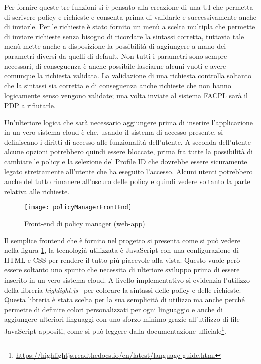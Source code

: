Per fornire queste tre funzioni si è pensato alla creazione di una UI che permetta di scrivere policy e richieste e consenta prima di validarle e successivamente anche di inviarle. Per le richieste è stato fornito un menù a scelta multipla che permette di inviare richieste senza bisogno di ricordare la sintassi corretta, tuttavia tale menù mette anche a disposizione la possibilità di aggiungere a mano dei parametri diversi da quelli di default. Non tutti i parametri sono sempre necessari, di conseguenza è anche possibile lasciarne alcuni vuoti e avere comunque la richiesta validata. La validazione di una richiesta controlla soltanto che la sintassi sia corretta e di conseguenza anche richieste che non hanno logicamente senso vengono validate; una volta inviate al sistema FACPL sarà il PDP a rifiutarle.\par
Un'ulteriore logica che sarà necessario aggiungere prima di inserire l'applicazione in un vero sistema cloud è che, usando il sistema di accesso presente, si definiscano i diritti di accesso alle funzionalità dell'utente. A seconda dell'utente alcune opzioni potrebbero quindi essere bloccate, prima fra tutte la possibilità di cambiare le policy e la selezione del Profile ID che dovrebbe essere sicuramente legato strettamente all'utente che ha eseguito l'accesso. Alcuni utenti potrebbero anche del tutto rimanere all'oscuro delle policy e quindi vedere soltanto la parte relativa alle richieste.\par
\begin{figure}[H]
    \begin{center}
    \texttt{[image: policyManagerFrontEnd]}
    \caption{Front-end di policy manager (web-app)}
    \label{fig:policyManagerFrontEnd}
    \end{center}
\end{figure}
Il semplice frontend che è fornito nel progetto si presenta come si può vedere nella figura \ref{fig:policyManagerFrontEnd}, la tecnologià utilizzata è JavaScript con una configurazione di HTML e CSS per rendere il tutto più piacevole alla vista. Questo vuole però essere soltanto uno spunto che necessita di ulteriore sviluppo prima di essere inserito in un vero sistema cloud.
A livello implementativo si evidenzia l'utilizzo della libreria \emph{highlight.js}~\cite{highlightjs} per colorare la sintassi delle policy e delle richieste. Questa libreria è stata scelta per la sua semplicità di utilizzo ma anche perché permette di definire colori personalizzati per ogni linguaggio e anche di aggiungere ulteriori linguaggi con uno sforzo minimo grazie all'utilizzo di file JavaScript appositi, come si può leggere dalla documentazione ufficiale\footnote{\url{https://highlightjs.readthedocs.io/en/latest/language-guide.html}}.\par

